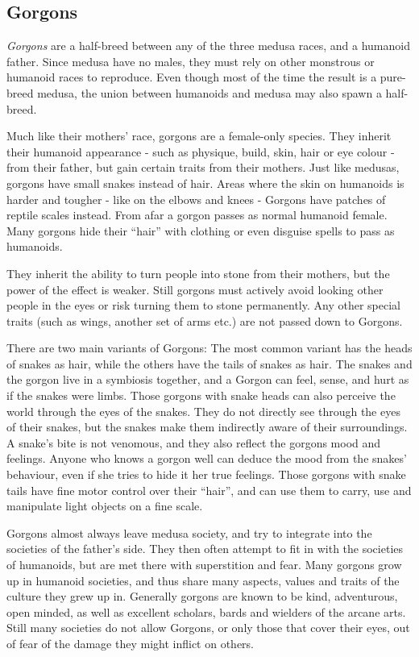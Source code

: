 \subsection{Gorgons}
\label{sec:Gorgons}

\emph{Gorgons} are a half-breed between any of the three medusa races, and a
humanoid father. Since medusa have no males, they must rely on other monstrous
or humanoid races to reproduce. Even though most of the time the result is a
pure-breed medusa, the union between humanoids and medusa may also spawn a
half-breed.

Much like their mothers' race, gorgons are a female-only species. They
inherit their humanoid appearance - such as physique, build, skin, hair or eye
colour - from their father, but gain certain traits from their mothers. Just
like medusas, gorgons have small snakes instead of hair. Areas where the skin
on humanoids is harder and tougher - like on the elbows and knees - Gorgons
have patches of reptile scales instead. From afar a gorgon passes as normal
humanoid female. Many gorgons hide their ``hair'' with clothing or even
disguise spells to pass as humanoids.

They inherit the ability to turn people into stone from their mothers, but
the power of the effect is weaker. Still gorgons must actively avoid looking
other people in the eyes or risk turning them to stone permanently. Any other
special traits (such as wings, another set of arms etc.) are not passed down
to Gorgons.

There are two main variants of Gorgons: The most common variant has the heads
of snakes as hair, while the others have the tails of snakes as hair. The
snakes and the gorgon live in a symbiosis together, and a Gorgon can feel,
sense, and hurt as if the snakes were limbs. Those gorgons with snake heads
can also perceive the world through the eyes of the snakes. They do not
directly see through the eyes of their snakes, but the snakes make them
indirectly aware of their surroundings. A snake's bite is not venomous, and
they also reflect the gorgons mood and feelings. Anyone who knows a gorgon
well can deduce the mood from the snakes' behaviour, even if she tries to hide
it her true feelings. Those gorgons with snake tails have fine motor control
over their ``hair'', and can use them to carry, use and manipulate light
objects on a fine scale.

Gorgons almost always leave medusa society, and try to integrate into the
societies of the father's side. They then often attempt to fit in with the
societies of humanoids, but are met there with superstition and fear. Many
gorgons grow up in humanoid societies, and thus share many aspects, values and
traits of the culture they grew up in. Generally gorgons are known to be kind,
adventurous, open minded, as well as excellent scholars, bards and wielders of
the arcane arts. Still many societies do not allow Gorgons, or only those that
cover their eyes, out of fear of the damage they might inflict on others.

